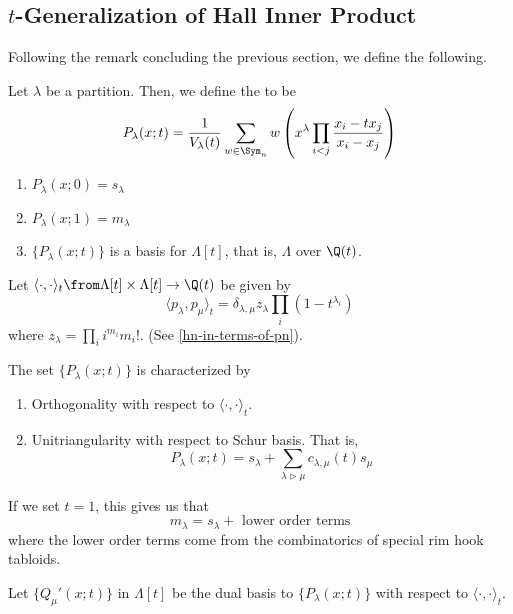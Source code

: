 \documentclass[11pt,leqno,oneside]{amsart}
\numberwithin{thm}{section}
\newcommand{\strictlydominates}{\mathrel{\rhd}}
\newcommand{\sym}{\Lambda}
\begin{document}
\subsection{\(t\)-Generalization of Hall Inner Product}
Following the remark concluding the previous section, we define the
following.
\begin{defn}
  Let \(\lambda\) be a partition. Then, we define the
   to be \[
    P_\lambda(x;t) = \frac{1}{V_\lambda(t)} \sum_{w \in \Sym_n} w
    \left( x^\lambda \prod_{i < j} \frac{x_i-tx_j}{x_i-x_j}\right)
  \]
\end{defn}
\begin{prop}
  \begin{enumerate}
  \item \(P_\lambda(x;0) = s_\lambda\)
  \item \(P_\lambda(x;1) = m_\lambda\)
  \item \(\{P_\lambda(x;t)\}\) is a basis for \(\sym[t]\), that is,
    \(\sym\) over \(\Q(t)\). 
  \end{enumerate}
\end{prop}
\begin{defn}
  Let \(\langle \cdot, \cdot \rangle_t \from \sym[t] \times \sym[t]
  \to \Q(t)\) be given by \[
    \langle p_\lambda, p_\mu \rangle_t = \delta_{\lambda,\mu}
    z_\lambda \prod_{i} (1-t^{\lambda_i})
  \]
  where \(z_\lambda = \prod_i i^{m_i} m_i!\). (See
  \ref{hn-in-terms-of-pn}). 
\end{defn}
\begin{prop}
  The set \(\{P_\lambda(x;t)\}\) is characterized by
  \begin{enumerate}
  \item Orthogonality with respect to \(\langle \cdot, \cdot
    \rangle_t\).
  \item Unitriangularity with respect to Schur basis. That is, \[
      P_\lambda(x;t) = s_\lambda + \sum_{\lambda \strictlydominates
        \mu} c_{\lambda,\mu}(t) s_\mu
    \]
  \end{enumerate}
\end{prop}
\begin{cor}
  If we set \(t=1\), this gives us that \[
    m_\lambda = s_\lambda + \text{ lower order terms}
  \]
  where the lower order terms come from the combinatorics of special
  rim hook tabloids.
\end{cor}
\begin{defn}
  Let \(\{Q_\mu'(x;t)\}\) in \(\sym[t]\) be the dual basis to
  \(\{P_\lambda(x;t)\}\) with respect to \(\langle \cdot,\cdot
  \rangle_t\). 
\end{defn}
\end{document}
